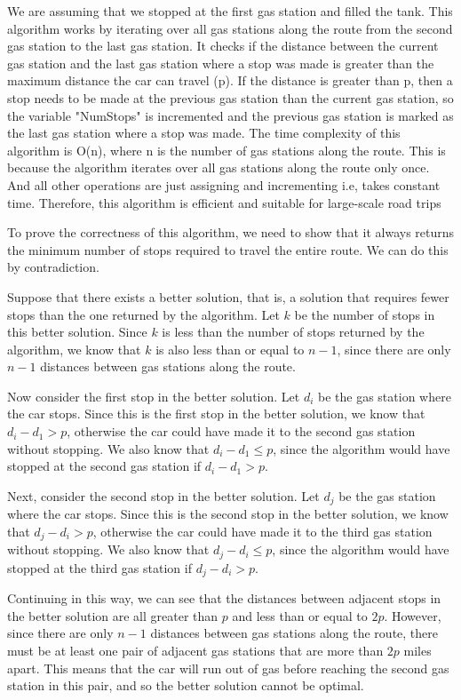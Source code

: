 \documentclass[fleqn,10pt]{olplainarticle}
\begin{document}
We are assuming that we stopped at the first gas station and filled the tank. This algorithm works by iterating over all gas stations along the route from the second gas station to the last gas station. It checks if the distance between the current gas station and the last gas station where a stop was made is greater than the maximum distance the car can travel (p). If the distance is greater than p, then a stop needs to be made at the previous gas station than the current gas station, so the variable "NumStops" is incremented and the previous gas station is marked as the last gas station where a stop was made.
\newline The time complexity of this algorithm is O(n), where n is the number of gas stations along the route. This is because the algorithm iterates over all gas stations along the route only once. And all other operations are just assigning and incrementing i.e, takes constant time. Therefore, this algorithm is efficient and suitable for large-scale road trips

To prove the correctness of this algorithm, we need to show that it always returns the minimum number of stops required to travel the entire route. We can do this by contradiction.

Suppose that there exists a better solution, that is, a solution that requires fewer stops than the one returned by the algorithm. Let $k$ be the number of stops in this better solution. Since $k$ is less than the number of stops returned by the algorithm, we know that $k$ is also less than or equal to $n-1$, since there are only $n-1$ distances between gas stations along the route.

Now consider the first stop in the better solution. Let $d_i$ be the gas station where the car stops. Since this is the first stop in the better solution, we know that $d_i - d_1 > p$, otherwise the car could have made it to the second gas station without stopping. We also know that $d_i - d_1 \leq p$, since the algorithm would have stopped at the second gas station if $d_i - d_1 > p$.

Next, consider the second stop in the better solution. Let $d_j$ be the gas station where the car stops. Since this is the second stop in the better solution, we know that $d_j - d_i > p$, otherwise the car could have made it to the third gas station without stopping. We also know that $d_j - d_i \leq p$, since the algorithm would have stopped at the third gas station if $d_j - d_i > p$.

Continuing in this way, we can see that the distances between adjacent stops in the better solution are all greater than $p$ and less than or equal to $2p$. However, since there are only $n-1$ distances between gas stations along the route, there must be at least one pair of adjacent gas stations that are more than $2p$ miles apart. This means that the car will run out of gas before reaching the second gas station in this pair, and so the better solution cannot be optimal.
\end{document}
